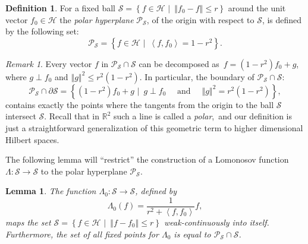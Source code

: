 \documentclass{tran-l}
\newtheorem{lem}[thm]{Lemma}
\theoremstyle{definition}
\newtheorem{defn}[thm]{Definition}
\theoremstyle{remark}
\newtheorem{rem}[thm]{Remark}
\numberwithin{equation}{subsection}
\newcommand{\To}{\longrightarrow}
\newcommand{\h}{\mathcal{H}}
\newcommand{\s}{\mathcal{S}}
\newcommand{\Real}{\mathbb{R}}
\newcommand{\Polar}{\mathcal{P}_{\s}}
\newcommand{\set}[1]{\left\{#1\right\}}
\newcommand{\seq}[1]{\left<#1\right>}
\newcommand{\norm}[1]{\left\Vert#1\right\Vert}
\begin{document}
\begin{defn}
For a fixed ball $\s=\set{f\in\h\,\,|\,\,\, \norm{f_0-f}\leq r}$ around the unit vector $f_0\in\h$ the \emph{polar hyperplane} $\Polar$, of the origin with respect to $\s$, is defined by the following set:
\[ \Polar = \set{f\in\h\,\,|\,\,\, \seq{f,f_0}=1-r^2}. \]
\end{defn}

\begin{rem}
Every vector $f$ in $\Polar\cap\s$ can be decomposed as\, $ f = (1-r^2)f_0 + g$, where $g\perp f_0$ and $\norm{g}^2\leq r^2(1-r^2)$. In particular, the boundary of $\Polar\cap\s$:
\[ \Polar \cap \partial \s = \set{(1-r^2)f_0 + g\,\,\big|\,\,\,
   g\perp f_0 \quad\text{ and }\quad \norm{g}^2=r^2(1-r^2)}, \]
contains exactly the points where the tangents from the origin to the ball $\s$ intersect $\s$. Recall that in $\Real^2$ such a line is called a \emph{polar},\, and our definition is just a straightforward generalization of this geometric term to higher dimensional Hilbert spaces.
\end{rem}

The following lemma will ``restrict'' the construction of a Lomonosov function $\Lambda\colon\s\To\s$ to the polar hyperplane $\Polar$.

\begin{lem} \label{l:SCALE}
The function $\Lambda_0\colon \s \To \s$, defined by
\[ \Lambda_0(f) = \frac{1}{r^2+\seq{f,f_0}} f, \]
maps the set $\s=\set{f\in\h\,\,|\,\,\, \norm{f-f_0}\leq{r}}$ weak-continuously into itself. Furthermore, the set of all fixed points for $\Lambda_0$ is equal to $\Polar\cap\s$.
\end{lem}
\end{document}
